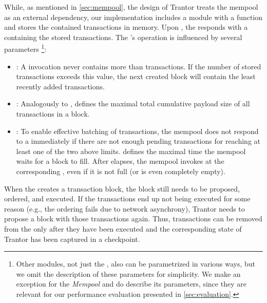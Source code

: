 \documentclass{article}
\begin{document}
While, as mentioned in \cref{sec:mempool}, the design of Trantor treats the mempool as an external dependency,
our implementation includes a  module with a  function and stores the contained transactions in memory.
Upon , the  responds with a  containing the stored transactions.
The 's operation is influenced by several parameters%
\footnote{Other modules, not just the , also can be parametrized in various ways, but we omit the description of these parameters for simplicity.
We make an exception for the \emph{Mempool} and do describe its parameters, since they are relevant for our performance evaluation presented in \cref{sec:evaluation}.}:

\begin{itemize}
    
    \item {}: A  invocation never contains more than  transactions.
    If the number of stored transactions exceeds this value, the next created block will contain the  least recently added transactions.
    
    \item {}: Analogously to ,
     defines the maximal total cumulative payload size of all transactions in a block.
    
    \item {}: To enable effective batching of transactions, the mempool does not respond to a  immediately
    if there are not enough pending transactions for reaching at least one of the two above limits.
     defines the maximal time the mempool waits for a block to fill.
    After  elapses, the mempool invokes  at the corresponding , even if it is not full (or is even completely empty).
\end{itemize}

When the  creates a transaction block, the block still needs to be proposed, ordered, and executed.
If the transactions end up not being executed for some reason (e.g., the ordering fails due to network asynchrony),
Trantor needs to propose a block with those transactions again.
Thus, transactions can be removed from the  only after they have been executed
and the corresponding state of Trantor has been captured in a checkpoint.
\end{document}
